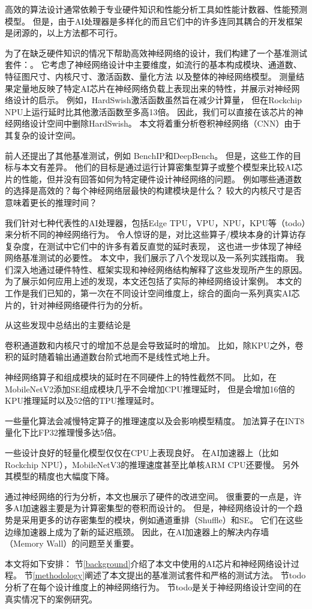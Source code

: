 高效的算法设计通常依赖于专业硬件知识和性能分析工具如性能计数器、性能预测模型。
但是，由于AI处理器是多样化的而且它们中的许多连同其耦合的开发框架是闭源的，以上方法都不可行。

为了在缺乏硬件知识的情况下帮助高效神经网络的设计，我们构建了一个基准测试套件：\sysname。
它考虑了神经网络设计中主要维度，如流行的基本构成模块、通道数、特征图尺寸、内核尺寸、激活函数、量化方法
以及整体的神经网络模型。
测量结果定量地反映了特定AI芯片在神经网络负载上表现出来的特性，并展示对神经网络设计的启示。
例如，HardSwish\cite{howard2019searching}激活函数虽然旨在减少计算量，
但在Rockchip NPU\cite{rk3399pro}上运行延时比其他激活函数至多高13倍。
因此，我们可以直接在该芯片的神经网络设计空间中删除HardSwish。
本文将着重分析卷积神经网络（CNN）由于其复杂的设计空间。

前人还提出了其他基准测试，例如
BenchIP\cite{tao2017benchip}和DeepBench\cite{deepbench}。
但是，这些工作的目标与本文有差异。
他们的目标是通过运行计算密集型算子或整个模型来比较AI芯片的性能，但并没有回答如何为特定硬件设计神经网络的问题。
例如哪些通道数的选择是高效的？每个神经网络层最快的构建模块是什么？
较大的内核尺寸是否意味着更长的推理时间？

我们针对七种代表性的AI处理器，包括Edge TPU，VPU，NPU，KPU等（todo）来分析不同的神经网络行为。
令人惊讶的是，对比这些算子/模块本身的计算访存复杂度，在测试中它们中的许多有着反直觉的延时表现，
这也进一步体现了神经网络基准测试的必要性。
本文中，我们展示了八个发现以及一系列实践指南。
我们深入地通过硬件特性、框架实现和神经网络结构解释了这些发现所产生的原因。
为了展示如何应用上述的发现，本文还包括了实际的神经网络设计案例。
本文的工作是我们已知的，第一次在不同设计空间维度上，综合的面向一系列真实AI芯片的，针对神经网络硬件行为的分析。

从这些发现中总结出的主要结论是
\begin{enumerate*}
    \item 卷积通道数和内核尺寸的增加不总是会导致延时的增加。
    比如，除KPU之外，卷积的延时随着输出通道数台阶式地而不是线性式地上升。
    \item 神经网络算子和组成模块的延时在不同硬件上的特性截然不同。
    比如，在MobileNetV2添加SE\cite{hu2018squeeze}组成模块几乎不会增加CPU推理延时，
    但是会增加16倍的KPU推理延时以及52倍的TPU推理延时。
    \item 一些量化算法会减慢特定算子的推理速度以及会影响模型精度。
    加法算子在INT8量化下比FP32推理慢多达5倍。
    \item 一些设计良好的轻量化模型仅仅在CPU上表现良好。
    在AI加速器上（比如Rockchip NPU），MobileNetV3的推理速度甚至比单核ARM CPU还要慢。
    另外其模型的精度也大幅度下降。
\end{enumerate*}

通过神经网络的行为分析，本文也展示了硬件的改进空间。
很重要的一点是，许多AI加速器主要是为计算密集型的卷积而设计的。
但是，神经网络设计的一个趋势是采用更多的访存密集型的模块，例如通道重排（Shuffle）和SE。
它们在这些边缘加速器上成为了新的延迟瓶颈。
因此，在AI加速器上的解决内存墙（Memory Wall）的问题至关重要。

本文将如下安排：
节\ref{background}介绍了本文中使用的AI芯片和神经网络设计过程。
节\ref{methodology}阐述了本文提出的基准测试套件和严格的测试方法。
节todo分析了在每个设计维度上的神经网络行为。
节todo是关于神经网络设计空间的在真实情况下的案例研究。

